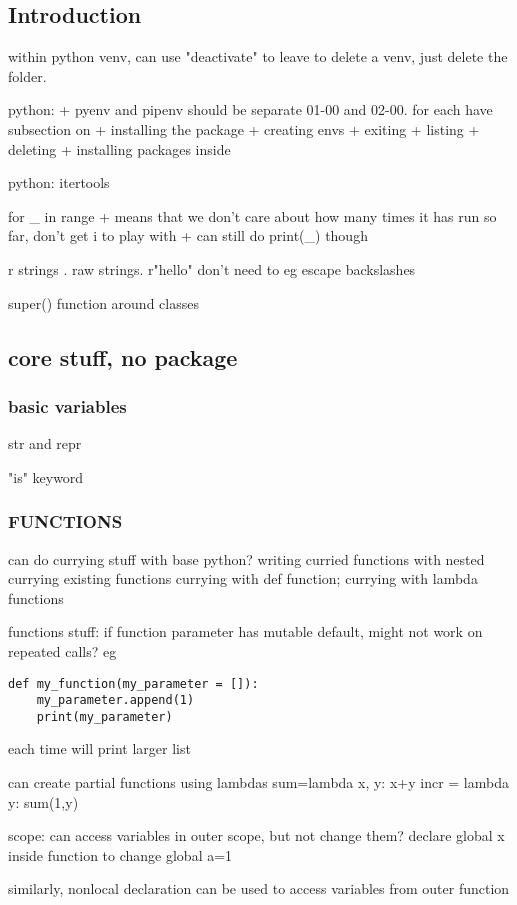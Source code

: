 
\subsection{Introduction}


within python venv, can use "deactivate" to leave
to delete a venv, just delete the folder.

python:
+ pyenv and pipenv should be separate 01-00 and 02-00. for each have subsection on
+ installing the package
+ creating envs
+ exiting
+ listing
+ deleting
+ installing packages inside


python: itertools

for \_ in range
+ means that we don't care about how many times it has run so far, don't get i to play with
+ can still do print(\_) though

r strings . raw strings.
r"hello"
don't need to eg escape backslashes

super() function around classes

\subsection{core stuff, no package}
\subsubsection{basic variables}
str and repr

"is" keyword
\subsubsection{FUNCTIONS}

can do currying stuff with base python?
writing curried functions with nested
currying existing functions
currying with def function; currying with lambda functions


functions stuff:
if function parameter has mutable default, might not work on repeated calls?
eg
\begin{verbatim}
def my_function(my_parameter = []):
    my_parameter.append(1)
    print(my_parameter)
\end{verbatim}
each time will print larger list


can create partial functions using lambdas
sum=lambda x, y: x+y
incr = lambda y: sum(1,y)


scope:
can access variables in outer scope, but not change them?
declare global x inside function to change global
a=1

similarly, nonlocal declaration can be used to access variables from outer function

